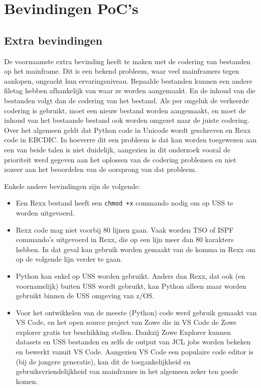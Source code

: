 \section{Bevindingen PoC's}
\subsection{Extra bevindingen}
De voornaamste extra bevinding heeft te maken met de codering van bestanden op het mainframe. Dit is een bekend probleem, waar veel mainframers tegen aanlopen, ongeacht hun ervaringsniveau. Bepaalde bestanden kunnen een andere filetag hebben afhankelijk van waar ze worden aangemaakt. En de inhoud van die bestanden volgt dan de codering van het bestand. Als per ongeluk de verkeerde codering is gebruikt, moet een nieuw bestand worden aangemaakt, en moet de inhoud van het bestaande bestand ook worden omgezet naar de juiste codering. Over het algemeen geldt dat Python code in Unicode wordt geschreven en Rexx code in EBCDIC. In hoeverre dit een probleem is dat kan worden toegewezen aan een van beide talen is niet duidelijk, aangezien in dit onderzoek vooral de prioriteit werd gegeven aan het oplossen van de codering problemen en niet zozeer aan het beoordelen van de oorsprong van dat probleem.

Enkele andere bevindingen zijn de volgende:
\begin{itemize}
    \item Een Rexx bestand heeft een \texttt{chmod +x} commando nodig om op USS te worden uitgevoerd.
    \item Rexx code mag niet voorbij 80 lijnen gaan. Vaak worden TSO of ISPF commando's uitgevoerd in Rexx, die op een lijn meer dan 80 karakters hebben. In dat geval kan gebruik worden gemaakt van de komma in Rexx om op de volgende lijn verder te gaan.
    \item Python kan enkel op USS worden gebruikt. Anders dan Rexx, dat ook (en voornamelijk) buiten USS wordt gebruikt, kan Python alleen maar worden gebruikt binnen de USS omgeving van z/OS.
    \item Voor het ontwikkelen van de meeste (Python) code werd gebruik gemaakt van VS Code, en het open source project van Zowe die in VS Code de Zowe explorer gratis ter beschikking stellen. Dankzij Zowe Explorer kunnen datasets en USS bestanden en zelfs de output van JCL jobs worden bekeken en bewerkt vanuit VS Code. Aangezien VS Code een populaire code editor is (bij de jongere generatie), kan dit de toegankelijkheid en gebruiksvriendelijkheid van mainframes in het algemeen zeker ten goede komen.
\end{itemize}

